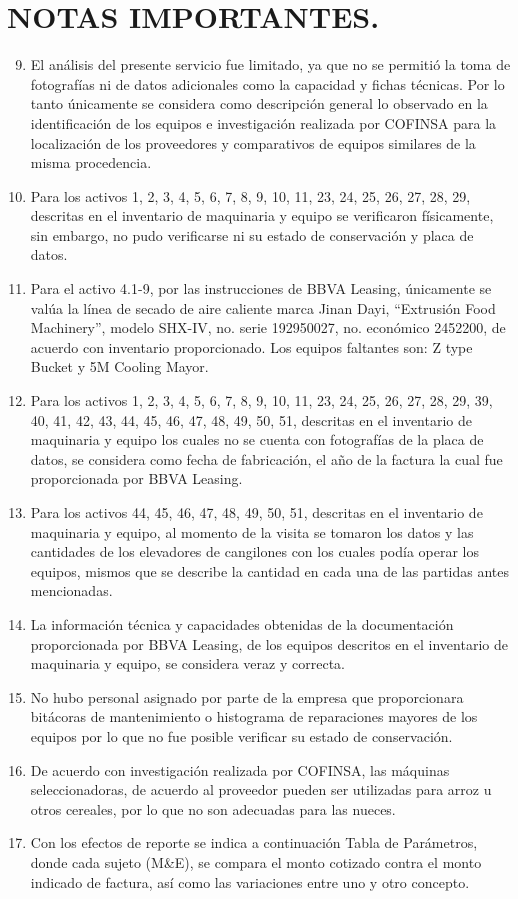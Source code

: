 \section{NOTAS IMPORTANTES.} %
\begin{enumerate}
\setcounter{enumi}{8}
\item El análisis del presente servicio fue limitado, ya que no se permitió la toma de fotografías ni de datos adicionales como la capacidad y fichas técnicas. Por lo tanto únicamente se considera como descripción general lo observado en la identificación de los equipos e investigación realizada por COFINSA para la localización de los proveedores y  comparativos de equipos similares de la misma procedencia.
\item Para los activos 1, 2, 3, 4, 5, 6, 7, 8, 9, 10, 11, 23, 24, 25, 26, 27, 28, 29, descritas en el inventario de maquinaria y equipo se verificaron físicamente, sin embargo, no pudo verificarse ni su estado de conservación y placa de datos.
\item Para el activo 4.1-9, por las instrucciones de BBVA Leasing, únicamente se valúa la línea de secado de aire caliente marca Jinan Dayi, ``Extrusión Food Machinery'', modelo SHX-IV, no. serie 192950027, no. económico 2452200, de acuerdo con inventario proporcionado. Los equipos faltantes son: Z type Bucket y 5M Cooling Mayor.
\item Para los activos 1, 2, 3, 4, 5, 6, 7, 8, 9, 10, 11, 23, 24, 25, 26, 27, 28, 29, 39, 40, 41, 42, 43, 44, 45, 46, 47, 48, 49, 50, 51,  descritas en el inventario de maquinaria y equipo los cuales no se cuenta con fotografías de la placa de datos,  se considera como fecha de fabricación,  el año de la factura la cual fue proporcionada por BBVA Leasing.
\item Para los activos 44, 45, 46, 47, 48, 49, 50, 51,  descritas en el inventario de maquinaria y equipo,  al momento de la visita se tomaron los datos y las cantidades de los elevadores de cangilones con los cuales podía operar los equipos,  mismos que se describe la cantidad en cada una de las partidas antes mencionadas.
\item La información técnica y capacidades obtenidas de la documentación proporcionada por BBVA Leasing, de los equipos descritos en el inventario de maquinaria y equipo, se considera veraz y correcta.
\item No hubo personal asignado por parte de la empresa que proporcionara bitácoras de mantenimiento o histograma de reparaciones mayores de los equipos por lo que no fue posible verificar su estado de conservación.
\item De acuerdo con investigación realizada por COFINSA, las máquinas seleccionadoras, de acuerdo al proveedor pueden ser utilizadas para arroz u otros cereales, por lo que no son adecuadas para las nueces.
\item Con los efectos de reporte se indica a continuación Tabla de Parámetros, donde cada sujeto (M\&E), se compara el monto cotizado contra el monto indicado de factura, así como las variaciones entre uno y otro concepto. 
\end{enumerate}
